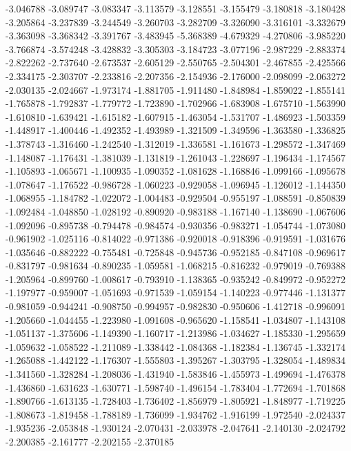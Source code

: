 -3.046788
-3.089747
-3.083347
-3.113579
-3.128551
-3.155479
-3.180818
-3.180428
-3.205864
-3.237839
-3.244549
-3.260703
-3.282709
-3.326090
-3.316101
-3.332679
-3.363098
-3.368342
-3.391767
-3.483945
-5.368389
-4.679329
-4.270806
-3.985220
-3.766874
-3.574248
-3.428832
-3.305303
-3.184723
-3.077196
-2.987229
-2.883374
-2.822262
-2.737640
-2.673537
-2.605129
-2.550765
-2.504301
-2.467855
-2.425566
-2.334175
-2.303707
-2.233816
-2.207356
-2.154936
-2.176000
-2.098099
-2.063272
-2.030135
-2.024667
-1.973174
-1.881705
-1.911480
-1.848984
-1.859022
-1.855141
-1.765878
-1.792837
-1.779772
-1.723890
-1.702966
-1.683908
-1.675710
-1.563990
-1.610810
-1.639421
-1.615182
-1.607915
-1.463054
-1.531707
-1.486923
-1.503359
-1.448917
-1.400446
-1.492352
-1.493989
-1.321509
-1.349596
-1.363580
-1.336825
-1.378743
-1.316460
-1.242540
-1.312019
-1.336581
-1.161673
-1.298572
-1.347469
-1.148087
-1.176431
-1.381039
-1.131819
-1.261043
-1.228697
-1.196434
-1.174567
-1.105893
-1.065671
-1.100935
-1.090352
-1.081628
-1.168846
-1.099166
-1.095678
-1.078647
-1.176522
-0.986728
-1.060223
-0.929058
-1.096945
-1.126012
-1.144350
-1.068955
-1.184782
-1.022072
-1.004483
-0.929504
-0.955197
-1.088591
-0.850839
-1.092484
-1.048850
-1.028192
-0.890920
-0.983188
-1.167140
-1.138690
-1.067606
-1.092096
-0.895738
-0.794478
-0.984574
-0.930356
-0.983271
-1.054744
-1.073080
-0.961902
-1.025116
-0.814022
-0.971386
-0.920018
-0.918396
-0.919591
-1.031676
-1.035646
-0.882222
-0.755481
-0.725848
-0.945736
-0.952185
-0.847108
-0.969617
-0.831797
-0.981634
-0.890235
-1.059581
-1.068215
-0.816232
-0.979019
-0.769388
-1.205964
-0.899760
-1.008617
-0.793910
-1.138365
-0.935242
-0.849972
-0.952272
-1.197977
-0.959007
-1.051693
-0.971539
-1.059154
-1.140223
-0.977446
-1.131377
-0.981059
-0.944241
-0.908750
-0.994957
-0.982830
-0.950606
-1.412718
-0.996091
-1.205660
-1.044455
-1.223980
-1.091608
-0.965620
-1.158541
-1.034807
-1.143108
-1.051137
-1.375606
-1.149390
-1.160717
-1.213986
-1.034627
-1.185330
-1.295659
-1.059632
-1.058522
-1.211089
-1.338442
-1.084368
-1.182384
-1.136745
-1.332174
-1.265088
-1.442122
-1.176307
-1.555803
-1.395267
-1.303795
-1.328054
-1.489834
-1.341560
-1.328284
-1.208036
-1.431940
-1.583846
-1.455973
-1.499694
-1.476378
-1.436860
-1.631623
-1.630771
-1.598740
-1.496154
-1.783404
-1.772694
-1.701868
-1.890766
-1.613135
-1.728403
-1.736402
-1.856979
-1.805921
-1.848977
-1.719225
-1.808673
-1.819458
-1.788189
-1.736099
-1.934762
-1.916199
-1.972540
-2.024337
-1.935236
-2.053848
-1.930124
-2.070431
-2.033978
-2.047641
-2.140130
-2.024792
-2.200385
-2.161777
-2.202155
-2.370185
